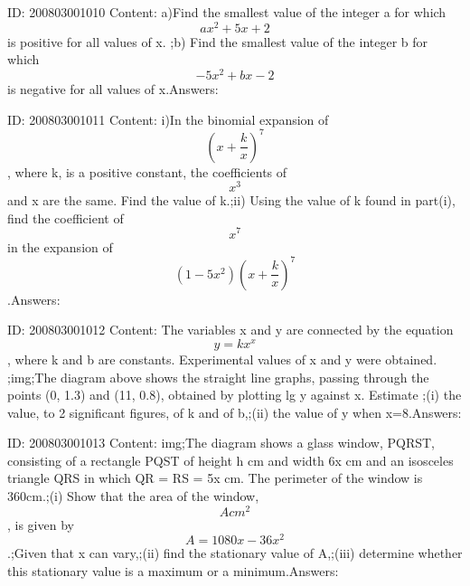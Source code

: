 \documentclass{article}
\begin{document}
ID: 200803001010
Content:
a)Find the smallest value of the integer a for which $$ax^2 + 5x + 2$$ is positive for all values of x. ;b) Find the smallest value of the integer b for which $$-5x^2 + bx - 2$$ is negative for all values of x.Answers:

ID: 200803001011
Content:
i)In the binomial expansion of $$(x + \frac{k}{x})^7$$, where k, is a positive constant, the coefficients of $$x^3$$ and x are the same. Find the value of k.;ii) Using the value of k found in part(i), find the coefficient of $$x^7$$ in the expansion of $$(1-5x^2)(x+ \frac{k}{x})^7$$.Answers:

ID: 200803001012
Content:
The variables x and y are connected by the equation $$y = kx^x$$, where k and b are constants. Experimental values of x and y were obtained. ;img;The diagram above shows the straight line graphs, passing through the points (0, 1.3) and (11, 0.8), obtained by plotting lg y against x. Estimate ;(i) the value, to 2 significant figures, of k and of b,;(ii) the value of y when x=8.Answers:

ID: 200803001013
Content:
img;The diagram shows a glass window, PQRST, consisting of a rectangle PQST of height h cm and width 6x cm and an isosceles triangle QRS in which QR = RS = 5x cm. The perimeter of the window is 360cm.;(i) Show that the area of the window, $$A cm^2$$, is given by $$A = 1080x - 36x^2$$.;Given that x can vary,;(ii) find the stationary value of A,;(iii) determine whether this stationary value is a maximum or a minimum.Answers:
\end{document}
